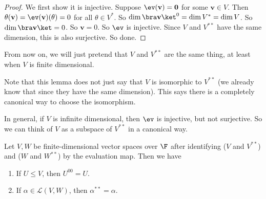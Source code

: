 \documentclass[a4paper]{article}
\begin{document}
\begin{proof}
  We first show it is injective. Suppose $\ev(\mathbf{v}) = \mathbf{0}$ for some $\mathbf{v}\in V$. Then $\theta (\mathbf{v}) = \ev (\mathbf{v})(\theta) = 0$ for all $\theta \in V^*$. So $\dim \bra \mathbf{v}\ket^0 = \dim V^* = \dim V$. So $\dim \bra \mathbf{v} \ket = 0$. So $\mathbf{v} = 0$. So $\ev$ is injective. Since $V$ and $V^{**}$ have the same dimension, this is also surjective. So done.
\end{proof}
From now on, we will just pretend that $V$ and $V^{**}$ are the same thing, at least when $V$ is finite dimensional.

Note that this lemma does not just say that $V$ is isomorphic to $V^{**}$ (we already know that since they have the same dimension). This says there is a completely canonical way to choose the isomorphism.

In general, if $V$ is infinite dimensional, then $\ev$ is injective, but not surjective. So we can think of $V$ as a subspace of $V^{**}$ in a canonical way.

\begin{lemma}
  Let $V, W$ be finite-dimensional vector spaces over $\F$ after identifying ($V$ and $V^{**}$) and ($W$ and $W^{**}$) by the evaluation map. Then we have
  \begin{enumerate}
    \item If $U\leq V$, then $U^{00} = U$.
    \item If $\alpha\in \mathcal{L}(V, W)$, then $\alpha^{**} = \alpha$.
  \end{enumerate}
\end{lemma}
\end{document}
